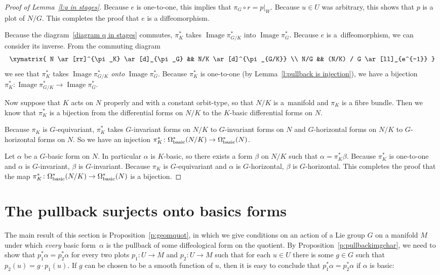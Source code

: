 \documentclass[11pt]{article}
\numberwithin{equation}{section}
\DeclareMathOperator {\image}{Image}
\newcommand{\hypref}[2]{{#2~\ref{#1}}}
\begin{document}
\begin{proof}[Proof of Lemma~\ref{l:q in stages}]
Because $e$ is one-to-one, this implies that $\pi_G \circ r = p|_W$.
Because $u \in U$ was arbitrary, this shows that $p$ is a plot of $N/G$.
This completes the proof that $e$ is a dif\/feomorphism.

Because the diagram~\eqref{diagram q in stages} commutes, $\pi_K^*$
takes $\image \pi_{G/K}^*$ into $\image \pi_G^*$.
Because $e$ is a~dif\/feomorphism, we can consider its inverse.
From the commuting diagram
\begin{gather*} \xymatrix{
 N \ar[rr]^{\pi_K} \ar[d]_{\pi_G} && N/K \ar[d]^{\pi_{G/K}} \\
  N/G &&   (N/K) / G \ar[ll]_{e^{-1}}
} \end{gather*}
we see that $\pi_K^*$ takes $\image \pi_{G/K}^*$ \emph{onto} $\image \pi_G^*$.
Because $\pi_K^*$ is one-to-one (by \hypref{l:pullback is injection}{Lemma}),
we have a bijection
$\pi_K^* \colon \image \pi_{G/K}^* \to \image \pi_G^*$.

Now suppose that $K$ acts on $N$ properly and with a constant orbit-type,
so that $N/K$ is a~mani\-fold and $\pi_K$ is a f\/ibre bundle.
Then we know that $\pi_K^*$ is a bijection from the dif\/ferential forms
on $N/K$ to the $K$-basic dif\/ferential forms on $N$.

Because $\pi_K$ is $G$-equivariant,
$\pi_K^*$ takes $G$-invariant forms on $N/K$
to $G$-invariant forms on $N$
and $G$-horizontal forms on $N/K$ to $G$-horizontal forms on $N$.
So we have an injection
$\pi_K^* \colon \Omega^*_{\rm basic}(N/K) \to \Omega^*_{\rm basic}(N)$.

Let $\alpha$ be a $G$-basic form on $N$. In particular $\alpha$ is $K$-basic,
so there exists a form $\beta$ on $N/K$ such that $\alpha = \pi_K^* \beta$.
Because $\pi_K^*$ is one-to-one and $\alpha$ is $G$-invariant,
$\beta$ is $G$-invariant.
Because $\pi_K$ is $G$-equivariant and $\alpha$ is $G$-horizontal,
$\beta$ is $G$-horizontal.
This completes the proof that the map
$\pi_K^* \colon \Omega^*_{\rm basic}(N/K) \to \Omega^*_{\rm basic}(N)$
is a bijection.
\end{proof}

\section{The pullback surjects onto basics forms} \label{sec:surjects}

The main result of this section is Proposition~\ref{p:geomquot},
in which we give conditions on an action of a Lie group $G$ on a manifold $M$
under which \emph{every} basic form~$\alpha$ is the pullback
of some dif\/feological form on the quotient.
By \hypref{p:pullbackimgchar}{Proposition},
we need to show that $p_1^*\alpha = p_2^*\alpha$ for every two plots
$p_1 \colon U \to M$ and $p_2 \colon U \to M$
such that
for each $u\in U$ there is some $g \in G$ such that $p_2(u) = g \cdot p_1(u)$.
If $g$ can be chosen to be a smooth function of $u$,
then it is easy to conclude that $p_1^*\alpha = p_2^*\alpha$
if $\alpha$ is basic:
\end{document}
